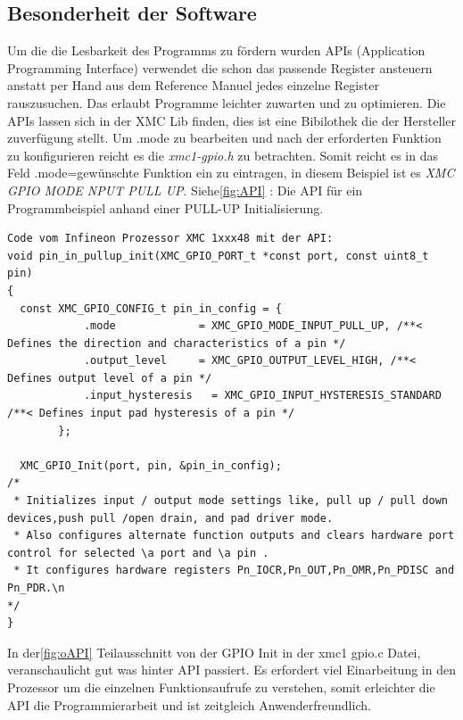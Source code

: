 \subsection{Besonderheit der Software}
\label{Besonderheit der Software}
Um die die Lesbarkeit des Programms zu fördern wurden APIs (Application Programming Interface) verwendet die schon das passende Register ansteuern anstatt per Hand aus dem Reference Manuel jedes einzelne Register rauszusuchen. Das erlaubt Programme leichter zuwarten und zu optimieren. Die APIs lassen sich in der XMC Lib finden, dies ist eine Bibilothek die der Hersteller zuverfügung stellt.
Um .mode zu bearbeiten und nach der erforderten Funktion zu konfigurieren reicht es die  \textit {xmc1-gpio.h} zu betrachten. Somit reicht es in das Feld .mode=gewünschte Funktion ein zu eintragen, in diesem Beispiel ist es \textit{XMC GPIO MODE NPUT PULL UP}.
Siehe\ref{fig:API} : Die API für ein Programmbeispiel anhand einer PULL-UP Initialisierung.
\\
\begin{minipage}{1\textwidth}
\begin{lstlisting}
Code vom Infineon Prozessor XMC 1xxx48 mit der API:
void pin_in_pullup_init(XMC_GPIO_PORT_t *const port, const uint8_t pin)
{
  const	XMC_GPIO_CONFIG_t pin_in_config = {
  			.mode             = XMC_GPIO_MODE_INPUT_PULL_UP, /**< Defines the direction and characteristics of a pin */
  			.output_level     = XMC_GPIO_OUTPUT_LEVEL_HIGH, /**< Defines output level of a pin */
  			.input_hysteresis	= XMC_GPIO_INPUT_HYSTERESIS_STANDARD /**< Defines input pad hysteresis of a pin */
  		};

  XMC_GPIO_Init(port, pin, &pin_in_config);
/*
 * Initializes input / output mode settings like, pull up / pull down devices,push pull /open drain, and pad driver mode.
 * Also configures alternate function outputs and clears hardware port control for selected \a port and \a pin .
 * It configures hardware registers Pn_IOCR,Pn_OUT,Pn_OMR,Pn_PDISC and Pn_PDR.\n
*/
}
\end{lstlisting}
\label{fig:API}
\end{minipage}

 In der\ref{fig:oAPI} Teilausschnitt von der GPIO Init in der xmc1 gpio.c Datei, veranschaulicht gut was hinter API passiert. Es erfordert viel Einarbeitung in den Prozessor um die einzelnen Funktionsaufrufe zu verstehen, somit erleichter die API die Programmierarbeit und ist zeitgleich Anwenderfreundlich.


